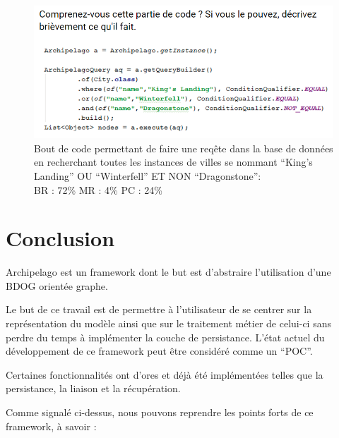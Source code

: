 \documentclass[a4paper,fleqn,12pt,oneside]{book}
\begin{document}
\begin{figure}[!ht]
\centering
\includegraphics[scale=0.9]{figures/Snippet4.png}
\caption{Bout de code permettant de faire une reqête dans la base de données en recherchant toutes les instances de villes se nommant \enquote{King's Landing} OU \enquote{Winterfell} ET NON \enquote{Dragonstone}:\\BR : 72\% MR : 4\% PC : 24\% }
\label{fig:Snippet4}
\end{figure}

\chapter{Conclusion}

Archipelago est un framework dont le but est d'abstraire l'utilisation d'une BDOG orientée graphe. 

Le but de ce travail est de permettre à l'utilisateur de se centrer sur la représentation du modèle ainsi que sur le traitement métier de celui-ci sans perdre du temps à implémenter la couche de persistance. L'état actuel du développement de ce framework peut être considéré comme un \enquote{POC}.

Certaines fonctionnalités ont d'ores et déjà été implémentées telles que la persistance, la liaison et la récupération.

Comme signalé ci-dessus, nous pouvons reprendre les points forts de ce framework, à savoir :
\end{document}
